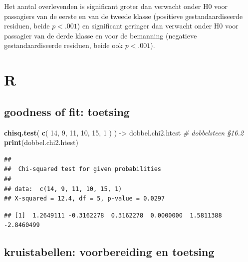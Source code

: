 \documentclass[
]{book}
\newenvironment{Shaded}{\begin{snugshade}}{\end{snugshade}}
\newcommand{\CommentTok}[1]{\textcolor[rgb]{0.56,0.35,0.01}{\textit{#1}}}
\newcommand{\DecValTok}[1]{\textcolor[rgb]{0.00,0.00,0.81}{#1}}
\newcommand{\FunctionTok}[1]{\textcolor[rgb]{0.13,0.29,0.53}{\textbf{#1}}}
\newcommand{\NormalTok}[1]{#1}
\newcommand{\OtherTok}[1]{\textcolor[rgb]{0.56,0.35,0.01}{#1}}
\newcommand{\SpecialCharTok}[1]{\textcolor[rgb]{0.81,0.36,0.00}{\textbf{#1}}}
\begin{document}
Het aantal overlevenden is significant groter dan verwacht onder H0 voor passagiers van de eerste en van de tweede klasse (positieve gestandaardiseerde residuen, beide \(p<.001\)) en significant geringer dan verwacht onder H0 voor passagier van de derde klasse en voor de bemanning (negatieve gestandaardiseerde residuen, beide ook \(p<.001\)).

\section{R}\label{r-17}

\subsection{goodness of fit: toetsing}\label{goodness-of-fit-toetsing-2}

\begin{Shaded}
\begin{Highlighting}[]
\FunctionTok{chisq.test}\NormalTok{( }\FunctionTok{c}\NormalTok{( }\DecValTok{14}\NormalTok{, }\DecValTok{9}\NormalTok{, }\DecValTok{11}\NormalTok{, }\DecValTok{10}\NormalTok{, }\DecValTok{15}\NormalTok{, }\DecValTok{1}\NormalTok{ ) ) }\OtherTok{{-}\textgreater{}}\NormalTok{ dobbel.chi2.htest }\CommentTok{\# dobbelsteen §16.2}
\FunctionTok{print}\NormalTok{(dobbel.chi2.htest)}
\end{Highlighting}
\end{Shaded}

\begin{verbatim}
## 
##  Chi-squared test for given probabilities
## 
## data:  c(14, 9, 11, 10, 15, 1)
## X-squared = 12.4, df = 5, p-value = 0.0297
\end{verbatim}

\begin{Shaded}
\end{Shaded}

\begin{verbatim}
## [1]  1.2649111 -0.3162278  0.3162278  0.0000000  1.5811388 -2.8460499
\end{verbatim}

\subsection{kruistabellen: voorbereiding en toetsing}\label{kruistabellen-voorbereiding-en-toetsing}
\end{document}
